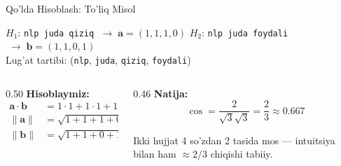 \documentclass[aspectratio=169,11pt]{beamer}
\begin{document}
\begin{frame}{Qo'lda Hisoblash: To'liq Misol}
  \begin{tcolorbox}[defbox,title=Kichik korpus (BoW vektorlari)]
    \small
    $H_1$: \texttt{nlp juda qiziq} $\;\to\; \mathbf{a}=(1,1,1,0)$\quad
    $H_2$: \texttt{nlp juda foydali} $\;\to\; \mathbf{b}=(1,1,0,1)$\\[2pt]
    {\scriptsize\color{halfgray}Lug'at tartibi:
    (\texttt{nlp}, \texttt{juda}, \texttt{qiziq}, \texttt{foydali})}
  \end{tcolorbox}
  \vspace{0.2em}
  \begin{columns}
    \begin{column}{0.50\textwidth}
      \textbf{Hisoblaymiz:}
      \begin{align*}
        \mathbf{a}\cdot\mathbf{b} &= 1{\cdot}1 + 1{\cdot}1 + 1{\cdot}0 + 0{\cdot}1 = 2\\
        \lVert\mathbf{a}\rVert &= \sqrt{1+1+1+0} = \sqrt{3}\\
        \lVert\mathbf{b}\rVert &= \sqrt{1+1+0+1} = \sqrt{3}
      \end{align*}
    \end{column}
    \begin{column}{0.46\textwidth}
      \textbf{Natija:}
      $$\cos = \frac{2}{\sqrt{3}\sqrt{3}} = \frac{2}{3} \approx 0.667$$
      \begin{tcolorbox}[okbox]
        \small Ikki hujjat 4 so'zdan 2 tasida mos --- intuitsiya
        bilan ham $\approx 2/3$ chiqishi tabiiy.
      \end{tcolorbox}
    \end{column}
  \end{columns}
\end{frame}
\end{document}
